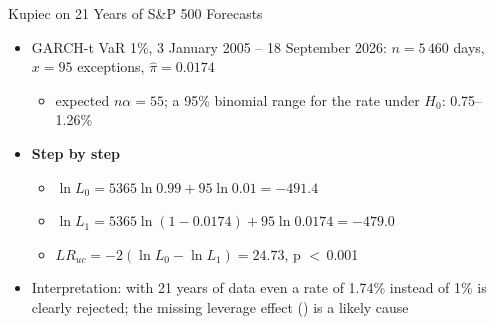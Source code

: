 \begin{frame}{Kupiec on 21 Years of S\&P 500 Forecasts}
\itemsize{\footnotesize}
\begin{itemize}
    \item GARCH-t VaR 1\%, 3 January 2005 -- 18 September 2026: $n = 5\,460$ days, $x = 95$ exceptions, $\hat\pi = 0.0174$
    \begin{itemize}
        \item expected $n\alpha = 55$; a 95\% binomial range for the rate under $H_0$: 0.75--1.26\%
    \end{itemize}
    \item \textbf{Step by step}
    \begin{itemize}
        \item $\ln L_0 = 5365\ln 0.99 + 95\ln 0.01 = -491.4$
        \item $\ln L_1 = 5365\ln(1 - 0.0174) + 95\ln 0.0174 = -479.0$
        \item $LR_{uc} = -2(\ln L_0 - \ln L_1) = 24.73$, p $<$\,0.001
    \end{itemize}
    \item Interpretation: with 21 years of data even a rate of 1.74\% instead of 1\% is clearly rejected; the missing leverage effect () is a likely cause
\end{itemize}
\end{frame}

